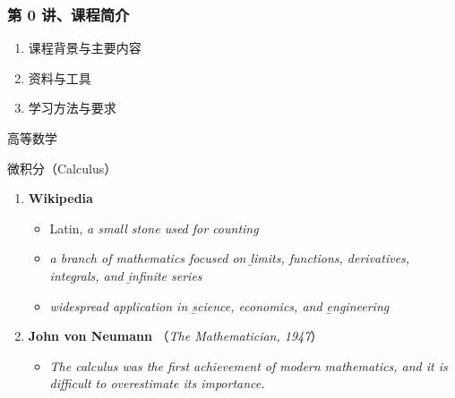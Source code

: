 \begin{frame}
\titlepage
\end{frame}

\begin{frame}
	\frametitle{第 0 讲、课程简介}
	\linespread{1.5}
	\begin{enumerate}
	    \item 课程背景与主要内容
	    \item 资料与工具
	    \item 学习方法与要求
	\end{enumerate}
\end{frame}

\begin{frame}{高等数学}
	\linespread{1.2}\pause 
	\begin{block}{微积分（Calculus）}\pause 
		\begin{enumerate}
		  \item {\bf Wikipedia}\pause 
		\begin{itemize}
		  \item Latin, {\it a small stone used for counting} \pause 
		  \item {\it a branch of mathematics focused on {\b limits, functions,
		  	derivatives, integrals,}  and {\b infinite series}} \pause
	  	  \item {\it widespread application in {\b science, economics,} and {\b
	  	  engineering}} \pause
		\end{itemize}
		\item {\bf John von Neumann} （{\small\it The Mathematician, 1947}）\pause
		\begin{itemize}
		  \item \alert{\it The calculus was the first achievement of modern
		  mathematics, and it is difficult to overestimate its importance.}
		\end{itemize}
		\end{enumerate}
	\end{block}
\end{frame}

